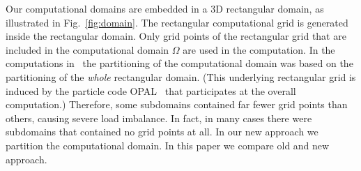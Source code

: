 \documentclass[oribibl]{llncs}
\begin{document}
Our computational domains are embedded in a 3D rectangular domain, as
illustrated in Fig.~\ref{fig:domain}.  The
rectangular computational grid is generated inside the rectangular
domain.  Only grid points of the rectangular grid that are included in
the computational domain $\Omega$ are used in the computation.  In the
computations in~\cite{adai:10} the partitioning of the computational
domain was based on the partitioning of the \emph{whole} rectangular
domain.  (This underlying rectangular grid is induced by the particle
code {OPAL}~\cite{opal} that participates at the overall computation.)
Therefore, some subdomains contained far fewer grid points than others,
causing severe load imbalance.  In fact, in many cases there were
subdomains that contained no grid points at all.  In our new approach we
partition the computational domain.  In this paper we compare old and
new approach.
\end{document}
